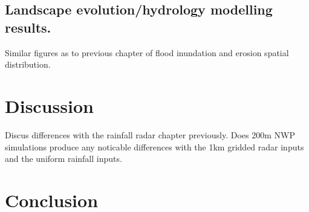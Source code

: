 \subsection{Landscape evolution/hydrology modelling results.}

Similar figures as to previous chapter of flood inundation and erosion spatial distribution. 

\section{Discussion} 

Discus differences with the rainfall radar chapter previously. Does 200m NWP simulations produce any noticable differences with the 1km gridded radar inputs and the uniform rainfall inputs. 

\section{Conclusion}








